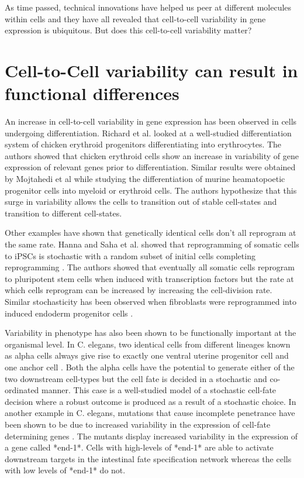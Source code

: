 As time passed, technical innovations have helped us peer at different molecules within cells and they have all revealed that cell-to-cell variability in gene expression is ubiquitous. But does this cell-to-cell variability matter?

\section{Cell-to-Cell variability can result in functional differences}

An increase in cell-to-cell variability in gene expression has been observed in cells undergoing differentiation. Richard et al.  \cite{richard_single-cell-based_2016} looked at a well-studied differentiation system of chicken erythroid progenitors differentiating into erythrocytes. The authors showed that chicken erythroid cells show an increase in variability of gene expression of relevant genes prior to differentiation. Similar results were obtained by Mojtahedi et al  \cite{mojtahedi_cell_2016} while studying the differentiation of murine heamatopoetic progenitor cells into myeloid or erythroid cells. The authors hypothesize that this surge in variability allows the cells to transition out of stable cell-states and transition to different cell-states. 

Other examples have shown that genetically identical cells don't all reprogram at the same rate. Hanna and Saha et al. showed that reprogramming of somatic cells to iPSCs is stochastic with a random subset of initial cells completing reprogramming  \cite{hanna_direct_2009}. The authors showed that eventually all somatic cells reprogram to pluripotent stem cells when induced with transcription factors but the rate at which cells reprogram can be increased by increasing the cell-division rate. Similar stochasticity has been observed when fibroblasts were reprogrammed into induced endoderm progenitor cells \cite{biddy_single-cell_2018}.

Variability in phenotype has also been shown to be functionally important at the organismal level. In C. elegans, two identical cells from different lineages known as alpha cells always give rise to exactly one ventral uterine progenitor cell and one anchor cell \cite{seydoux_cell_1989}. Both the alpha cells have the potential to generate either of the two downstream cell-types but the cell fate is decided in a stochastic and co-ordinated manner. This case is a well-studied model of a stochastic cell-fate decision where a robust outcome is produced as a result of a stochastic choice. In another example in C. elegans, mutations that cause incomplete penetrance have been shown to be due to increased variability in the expression of cell-fate determining genes  \cite{raj_variability_2010}.  The mutants display increased variability in the expression of a gene called *end-1*. Cells with high-levels of *end-1* are able to activate downstream targets in the intestinal fate specification network whereas the cells with low levels of *end-1* do not. 

